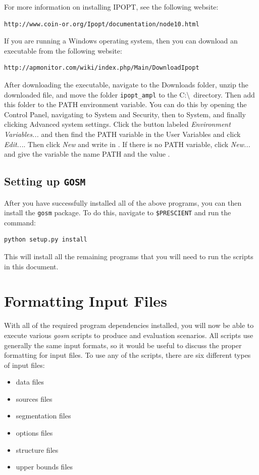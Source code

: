 \documentclass[11pt]{article}
\begin{document}
For more information on installing IPOPT, see the following website:
\begin{verbatim}
http://www.coin-or.org/Ipopt/documentation/node10.html
\end{verbatim}
If you are running a Windows operating system, then you can download an executable from the following website:
\begin{verbatim}
http://apmonitor.com/wiki/index.php/Main/DownloadIpopt
\end{verbatim}
After downloading the executable, navigate to the Downloads folder, unzip the downloaded file, and move the folder \texttt{ipopt\_ampl} to the C:\textbackslash\ directory. Then add this folder to the PATH environment variable. You can do this by opening the Control Panel, navigating to System and Security, then to System, and finally clicking Advanced system settings. Click the button labeled \emph{Environment Variables...} and then find the PATH variable in the User Variables and click \emph{Edit...}. Then click {\it New} and write in . If there is no PATH variable, click \emph{New...} and give the variable the name PATH  and the value .

\subsection{Setting up \texttt{GOSM}}
After you have successfully installed all of the above programs, you can then install the \texttt{gosm} package. To do this, navigate to \texttt{\$PRESCIENT} and run the command:
\begin{verbatim}
python setup.py install
\end{verbatim}
This will install all the remaining programs that you will need to run the scripts in this document.

\section{Formatting Input Files}

With all of the required program dependencies installed, you will now be able to execute various \textit{gosm} scripts to produce and evaluation scenarios. All scripts use generally the same input formats, so it would be useful
to discuss the proper formatting for input files. To use any of the scripts, there are six different types of input files:
\begin{itemize}
	\item data files
	\item sources files
	\item segmentation files
	\item options files
	\item structure files
	\item upper bounds files
\end{itemize}
\end{document}
